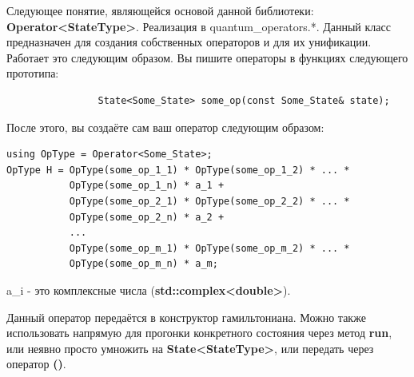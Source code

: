 \documentclass[12pt,fleqn]{article}
\begin{document}
        Следующее понятие, являющейся основой данной библиотеки: \textbf{Operator<StateType>}. Реализация в \textsf{quantum\_operators.*}. Данный класс предназначен для создания 
        собственных операторов и для их унификации. Работает это следующим образом.
        Вы пишите операторы в функциях следующего прототипа:
        \begin{center}

        \begin{mdframed}[linecolor=black, topline=true, bottomline=true,
            leftline=false, rightline=true]
            \begin{verbatim}
                State<Some_State> some_op(const Some_State& state);
            \end{verbatim}
        \end{mdframed}
        \end{center}

        После этого, вы создаёте сам ваш оператор следующим образом:

        \begin{mdframed}[linecolor=black, topline=true, bottomline=true,
            leftline=false, rightline=true]
            \begin{verbatim}
using OpType = Operator<Some_State>;
OpType H = OpType(some_op_1_1) * OpType(some_op_1_2) * ... * 
           OpType(some_op_1_n) * a_1 + 
           OpType(some_op_2_1) * OpType(some_op_2_2) * ... *
           OpType(some_op_2_n) * a_2 +
           ...
           OpType(some_op_m_1) * OpType(some_op_m_2) * ... *
           OpType(some_op_m_n) * a_m;
            \end{verbatim}
        \end{mdframed}

        \textsf{a\_i} - это комплексные числа (\textbf{std::complex<double>}).

        Данный оператор передаётся в конструктор гамильтониана. Можно также использовать напрямую для прогонки конкретного состояния
         через метод \textbf{run}, или неявно просто умножить на \textbf{State<StateType>}, или передать через оператор \textbf{()}.
\end{document}
